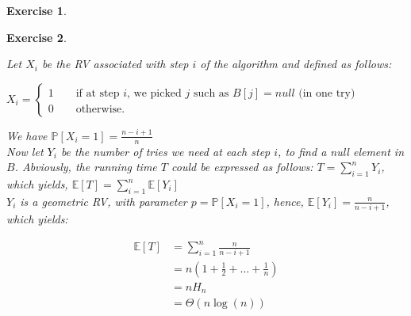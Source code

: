 \documentclass{article}
\newtheorem{exo}{Exercise}
\def\P{\mathbb{P}}
\def\E{\mathbb{E}}
\begin{document}
\begin{exo}{\ \\}

\end{exo}

\begin{exo}{\ \\}

Let $X_i$ be the RV associated with step $i$ of the algorithm and defined as follows:

$X_i = 
\begin{cases}
    1 \quad \quad \text{if at step $i$, we picked $j$ such as $B[j] = null$ (in one try)} \\
    0 \quad \quad \text{otherwise.} 
\end{cases}
$

 We have $\P[X_i = 1] = \frac{n-i+1}{n}$ \\




Now let $Y_i$ be the number of tries we need at each step $i$, to find a null element in $B$. Abviously, the running time $T$ could be expressed as follows: $T = \sum^{n}_{i=1} Y_i$, which yields, $\E[T] = \sum^{n}_{i=1} \E[Y_i]$ \\

$Y_i$ is a geometric RV, with parameter $p = \P[X_i = 1]$, hence, $\E[Y_i] = \frac{n}{n-i+1} $, which yields:

\begin{align*}
    \E[T] 
    &= \sum^{n}_{i=1} \frac{n}{n-i+1} \\
    &= n(1+ \frac{1}{2} + \dots + \frac{1}{n} ) \\
    &= n H_n \\
    &= \Theta(n\log(n))
\end{align*}






\end{exo}
\end{document}
